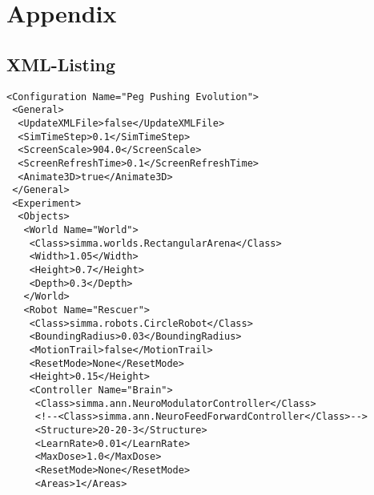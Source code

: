 \documentclass[12pt,fleqn,a4paper]{article}
\begin{document}



\section{Appendix}

\subsection{XML-Listing}

\lstset{language=XML}
\begin{lstlisting}
<Configuration Name="Peg Pushing Evolution">
 <General>
  <UpdateXMLFile>false</UpdateXMLFile>
  <SimTimeStep>0.1</SimTimeStep>
  <ScreenScale>904.0</ScreenScale>
  <ScreenRefreshTime>0.1</ScreenRefreshTime>
  <Animate3D>true</Animate3D>
 </General>
 <Experiment>
  <Objects>
   <World Name="World">
    <Class>simma.worlds.RectangularArena</Class>
    <Width>1.05</Width>
    <Height>0.7</Height>
    <Depth>0.3</Depth>
   </World>
   <Robot Name="Rescuer">
    <Class>simma.robots.CircleRobot</Class>
    <BoundingRadius>0.03</BoundingRadius>
    <MotionTrail>false</MotionTrail>
    <ResetMode>None</ResetMode>
    <Height>0.15</Height>
    <Controller Name="Brain">
     <Class>simma.ann.NeuroModulatorController</Class>
     <!--<Class>simma.ann.NeuroFeedForwardController</Class>-->
     <Structure>20-20-3</Structure>
     <LearnRate>0.01</LearnRate>
     <MaxDose>1.0</MaxDose>
     <ResetMode>None</ResetMode>
     <Areas>1</Areas>
     

\end{lstlisting}
\end{document}

